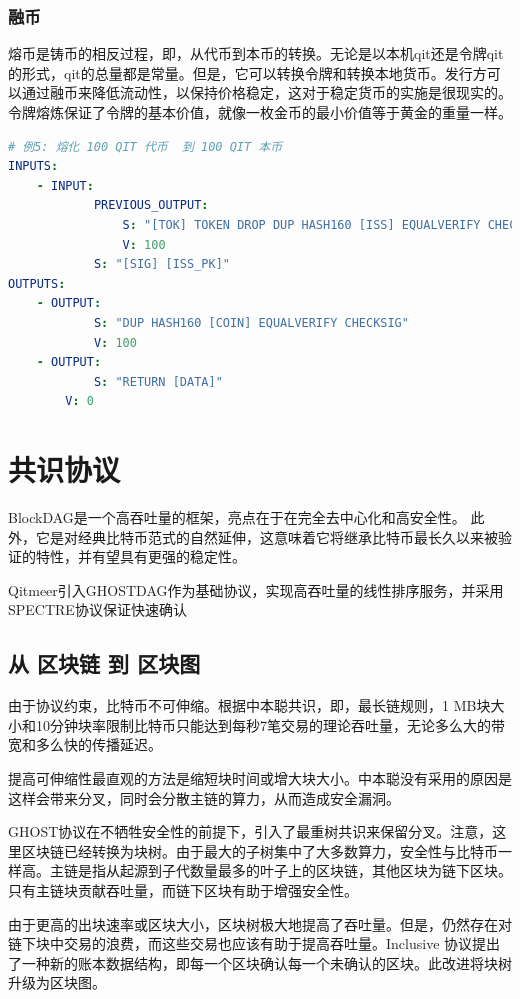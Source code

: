 \documentclass[a4paper,11pt]{article}
\begin{document}
\subsubsection{融币}

熔币是铸币的相反过程，即，从代币到本币的转换。无论是以本机qit还是令牌qit的形式，qit的总量都是常量。但是，它可以转换令牌和转换本地货币。发行方可以通过融币来降低流动性，以保持价格稳定，这对于稳定货币的实施是很现实的。令牌熔炼保证了令牌的基本价值，就像一枚金币的最小价值等于黄金的重量一样。

\lstset{basicstyle=\tiny,style=myListStyle}
\begin{lstlisting}[language=yaml, numbers=none,basicstyle=\footnotesize]
# 例5: 熔化 100 QIT 代币  到 100 QIT 本币 
INPUTS:
	- INPUT:
			PREVIOUS_OUTPUT:
				S: "[TOK] TOKEN DROP DUP HASH160 [ISS] EQUALVERIFY CHECKSIG"
				V: 100
			S: "[SIG] [ISS_PK]"
OUTPUTS:
	- OUTPUT:
			S: "DUP HASH160 [COIN] EQUALVERIFY CHECKSIG"
			V: 100
	- OUTPUT:
			S: "RETURN [DATA]"
		V: 0
\end{lstlisting}


\section{共识协议}

BlockDAG是一个高吞吐量的框架，亮点在于在完全去中心化和高安全性。
此外，它是对经典比特币范式的自然延伸，这意味着它将继承比特币最长久以来被验证的特性，并有望具有更强的稳定性。

Qitmeer引入GHOSTDAG作为基础协议，实现高吞吐量的线性排序服务，并采用SPECTRE协议保证快速确认

\subsection{从 区块链 到 区块图}
由于协议约束，比特币不可伸缩。根据中本聪共识，即，最长链规则，1 MB块大小和10分钟块率限制比特币只能达到每秒7笔交易的理论吞吐量，无论多么大的带宽和多么快的传播延迟。

提高可伸缩性最直观的方法是缩短块时间或增大块大小。中本聪没有采用的原因是这样会带来分叉，同时会分散主链的算力，从而造成安全漏洞。


GHOST协议在不牺牲安全性的前提下，引入了最重树共识来保留分叉。注意，这里区块链已经转换为块树。由于最大的子树集中了大多数算力，安全性与比特币一样高。主链是指从起源到子代数量最多的叶子上的区块链，其他区块为链下区块。只有主链块贡献吞吐量，而链下区块有助于增强安全性。

由于更高的出块速率或区块大小，区块树极大地提高了吞吐量。但是，仍然存在对链下块中交易的浪费，而这些交易也应该有助于提高吞吐量。Inclusive\cite{Inclusive} 协议提出了一种新的账本数据结构，即每一个区块确认每一个未确认的区块。此改进将块树升级为区块图。
\end{document}
